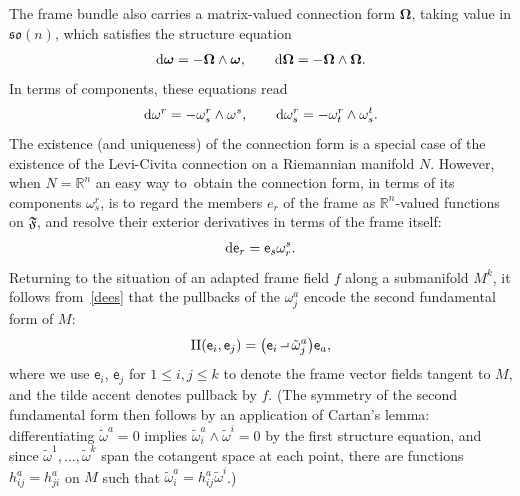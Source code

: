 \documentclass[pdftex]{sigma}
\def\R{\mathbb{R}}
\def\ve{\mathsf{e}}
\def\vomega{\boldsymbol{\omega}}
\def\vOmega{\boldsymbol{\Omega}}
\def\vOmega{\boldsymbol{\Omega}}
\def\II{\operatorname{II}} %
\def\F{\mathfrak{F}}
\def\w{\omega}
\def\tw{\tilde\omega}
\newcommand{\intprod}{\mathbin{\raisebox{.4ex}{\hbox{\vrule height .5pt width 5pt depth 0pt \vrule height 3pt width .5pt depth 0pt}}}}
\numberwithin{equation}{section}
\begin{document}
The frame bundle also carries a matrix-valued connection form $\vOmega$, taking value in $\mathfrak{so}(n)$, which satisfies the structure equation
\begin{gather*}
{\rm d}\vomega = -\vOmega \wedge \vomega, \qquad {\rm d}\vOmega = - \vOmega \wedge \vOmega.
\end{gather*}
In terms of components, these equations read
\begin{gather} \label{streq}
{\rm d}\w^r = -\w^r_s \wedge \w^s, \qquad {\rm d}\w^r_s = -\w^r_t \wedge \w^t_s.
\end{gather}
The existence (and uniqueness) of the connection form is a special case of the existence of the Levi-Civita connection on a Riemannian manifold $N$. However, when $N=\R^n$ an easy way to~obtain the connection form, in terms of its components $\omega^r_s$, is to regard the members $e_r$ of the frame as $\R^n$-valued functions on $\F$, and resolve their exterior derivatives in terms of the frame itself:
\begin{gather} \label{dees}
{\rm d}\ve_r = \ve_s \omega^s_r.
\end{gather}
Returning to the situation of an adapted frame field $f$ along a submanifold $M^k$, it follows from~\eqref{dees} that the pullbacks of the $\w^a_j$ encode the second fundamental form of $M$:
\begin{gather} \label{fundyomega}
\II(\ve_i, \ve_j) = \big(\ve_i \intprod \tw^a_j\big) \ve_a,
\end{gather}
where we use $\ve_i$, $\ve_j$ for $1\le i,j \le k$ to denote the frame vector fields tangent to $M$, and the tilde accent denotes pullback by $f$. (The symmetry of the second fundamental form then follows by an application of Cartan's lemma: differentiating $\tw^a = 0$ implies $\tw^a_i \wedge \tw^i = 0$ by the first structure equation, and since $\tw^1, \dots, \tw^k$ span the cotangent space at each point, there are functions $h^a_{ij} = h^a_{ji}$ on $M$ such that $\tw^a_i = h^a_{ij} \tw^i$.)
\end{document}
